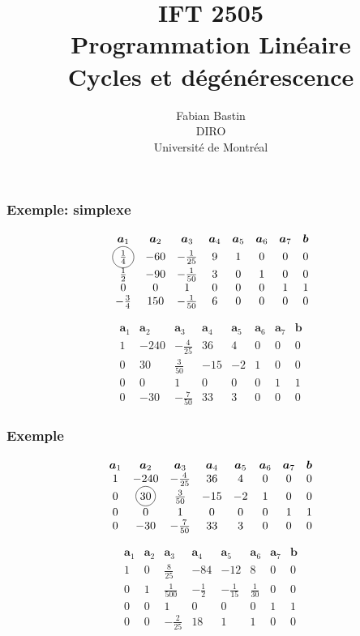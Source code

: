 \documentclass[usepdftitle=false]{beamer}
\title[IFT2505]{IFT 2505\\Programmation Linéaire\\Cycles et dégénérescence}
\author[Fabian Bastin]{Fabian Bastin\\DIRO\\Université de Montréal}
\date{}
\newcommand*\circled[1]{\tikz[baseline=(char.base)]{
		\node[shape=circle,draw,inner sep=2pt] (char) {#1};}}
\def\ba{\boldsymbol{a}}
\def\bb{\boldsymbol{b}}
\begin{document}
\frame{\titlepage}

% 

\begin{frame}
\frametitle{Exemple: simplexe}

\[
\begin{matrix}
\ba_1 & \ba_2 & \ba_3 & \ba_4 & \ba_5 &\ba_6 &\ba_7 & \bb \\
\circled{$\frac{1}{4}$} & -60 & -\frac{1}{25} & 9 & 1 & 0 & 0 & 0 \\
\frac{1}{2} & -90 & -\frac{1}{50} & 3 & 0 & 1 & 0 & 0 \\
0 & 0 & 1 & 0 & 0 & 0 & 1 & 1 \\
-\frac{3}{4} & 150 & -\frac{1}{50} & 6 & 0 & 0 & 0 & 0
\end{matrix}
\]

\[
\begin{matrix}
\ba_1 & \ba_2 & \ba_3 & \ba_4 & \ba_5 &\ba_6 &\ba_7 & \bb \\
1 & -240 & -\frac{4}{25} & 36 & 4 & 0 & 0 & 0 \\
0 & 30 & \frac{3}{50} & -15 & -2 & 1 & 0 & 0 \\
0 & 0 & 1 & 0 & 0 & 0 & 1 & 1 \\
0 & -30 & -\frac{7}{50} & 33 & 3 & 0 & 0 & 0
\end{matrix}
\]

\end{frame}

\begin{frame}
\frametitle{Exemple}

\[
\begin{matrix}
\ba_1 & \ba_2 & \ba_3 & \ba_4 & \ba_5 &\ba_6 &\ba_7 & \bb \\
1 & -240 & -\frac{4}{25} & 36 & 4 & 0 & 0 & 0 \\
0 & \circled{30} & \frac{3}{50} & -15 & -2 & 1 & 0 & 0 \\
0 & 0 & 1 & 0 & 0 & 0 & 1 & 1 \\
0 & -30 & -\frac{7}{50} & 33 & 3 & 0 & 0 & 0
\end{matrix}
\]

\[
\begin{matrix}
\ba_1 & \ba_2 & \ba_3 & \ba_4 & \ba_5 &\ba_6 &\ba_7 & \bb \\
1 & 0 & \frac{8}{25} & -84 & -12 & 8 & 0 & 0 \\
0 & 1 & \frac{1}{500} & -\frac{1}{2} & -\frac{1}{15} & \frac{1}{30} & 0 & 0 \\
0 & 0 & 1 & 0 & 0 & 0 & 1 & 1 \\
0 & 0 & -\frac{2}{25} & 18 & 1 & 1 & 0 & 0
\end{matrix}
\]

\end{frame}
\end{document}
